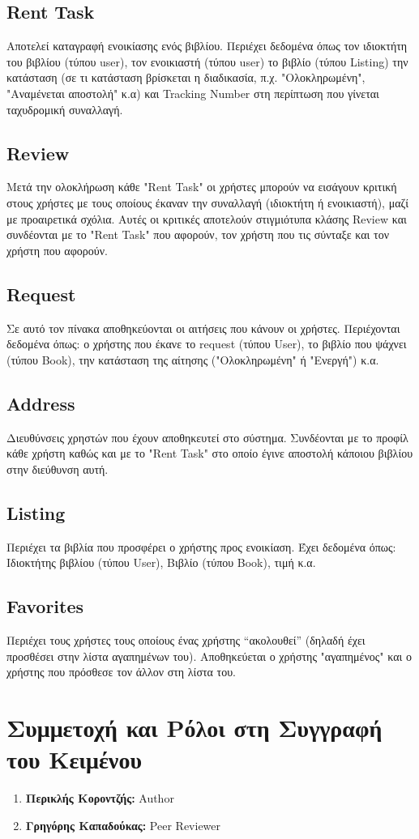 \documentclass[12pt,a4paper]{article}
\begin{document}
\subsection{Rent Task}
Αποτελεί καταγραφή ενοικίασης ενός βιβλίου. Περιέχει δεδομένα όπως τον ιδιοκτήτη του βιβλίου (τύπου user), τον ενοικιαστή (τύπου user) το βιβλίο (τύπου Listing) την κατάσταση (σε τι κατάσταση βρίσκεται η διαδικασία, π.χ. "Ολοκληρωμένη", "Αναμένεται αποστολή" κ.α) και Tracking Number στη περίπτωση που γίνεται ταχυδρομική συναλλαγή.

\subsection{Review}
Μετά την ολοκλήρωση κάθε "Rent Task" οι χρήστες μπορούν να εισάγουν κριτική στους χρήστες με τους οποίους έκαναν την συναλλαγή (ιδιοκτήτη ή ενοικιαστή), μαζί με προαιρετικά σχόλια. Αυτές οι κριτικές αποτελούν στιγμιότυπα κλάσης Review και συνδέονται με το "Rent Task" που αφορούν, τον χρήστη που τις σύνταξε και τον χρήστη που αφορούν.

\subsection{Request}
Σε αυτό τον πίνακα αποθηκεύονται οι αιτήσεις που κάνουν οι χρήστες. Περιέχονται δεδομένα όπως: ο χρήστης που έκανε το request (τύπου User), το βιβλίο που ψάχνει (τύπου Book), την κατάσταση της αίτησης ("Ολοκληρωμένη" ή "Ενεργή") κ.α.

\subsection{Address}
Διευθύνσεις χρηστών που έχουν αποθηκευτεί στο σύστημα. Συνδέονται με το προφίλ κάθε χρήστη καθώς και με το "Rent Task" στο οποίο έγινε αποστολή κάποιου βιβλίου στην διεύθυνση αυτή.

\subsection{Listing}
Περιέχει τα βιβλία που προσφέρει ο χρήστης προς ενοικίαση. Έχει δεδομένα όπως: Ιδιοκτήτης βιβλίου (τύπου User), Βιβλίο (τύπου Book), τιμή κ.α.

\subsection{Favorites}
Περιέχει τους χρήστες τους οποίους ένας χρήστης “ακολουθεί” (δηλαδή έχει προσθέσει στην λίστα αγαπημένων του). Αποθηκεύεται ο χρήστης "αγαπημένος" και ο χρήστης που πρόσθεσε τον άλλον στη λίστα του.

\section{Συμμετοχή και Ρόλοι στη Συγγραφή του Κειμένου}
\begin{enumerate}
	\item \textbf{Περικλής Κοροντζής:} Author
	\item \textbf{Γρηγόρης Καπαδούκας:} Peer Reviewer
\end{enumerate}
\end{document}

